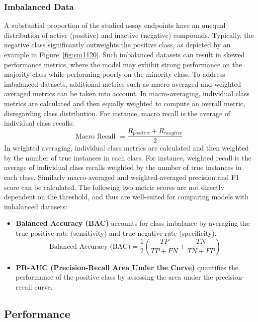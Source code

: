 \subsubsection{Imbalanced Data}
A substantial proportion of the studied assay endpoints have an unequal distribution of active (positive) and inactive (negative) compounds. Typically, the negative class significantly outweights the positive class, as depicted by an example in Figure~\ref{fig:cm1120}. Such imbalanced datasets can result in skewed performance metrics, where the model may exhibit strong performance on the majority class while performing poorly on the minority class. To address imbalanced datasets, additional metrics such as macro averaged and weighted averaged metrics can be taken into account.
In macro-averaging, individual class metrics are calculated and then equally weighted to compute an overall metric, disregarding class distribution. For instance, macro recall is the average of individual class recalls:
\[
\text{Macro Recall } = \frac{R_{positive} + R_{neagtive}}{2}
\]
In weighted averaging, individual class metrics are calculated and then weighted by the number of true instances in each class. For instance, weighted recall is the average of individual class recalls weighted by the number of true instances in each class. Similarly macro-averaged and weighted-averaged precision and F1 score can be calculated. The following two metric scores are not directly dependent on the threshold, and thus are well-suited for comparing models with imbalanced datasets:

\begin{itemize}
  \item \textbf{Balanced Accuracy (BAC)} accounts for class imbalance by averaging the true positive rate (sensitivity) and true negative rate (specificity).
  \[ \text{Balanced Accuracy (BAC)} = \frac{1}{2} \left(\frac{TP}{TP + FN} + \frac{TN}{TN + FP}\right) \]

  \item \textbf{PR-AUC (Precision-Recall Area Under the Curve)} quantifies the performance of the positive class by assessing the area under the precision-recall curve.
  
\end{itemize}



\subsection{Performance}\label{sec:performance}

